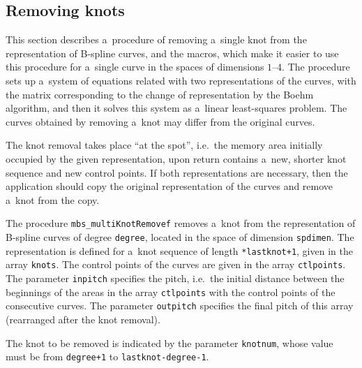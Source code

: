 \subsection{Removing knots}

This section describes a~procedure of removing a~single knot from the
representation of B-spline curves, and the macros, which make it easier to
use this procedure for a~single curve in the spaces of dimensions
$1$--$4$. The procedure sets up a~system of equations related with two
representations of the curves, with the matrix corresponding to the
change of representation by the Boehm algorithm, and then it solves this
system as a~linear least-squares problem. The curves obtained by
removing a~knot may differ from the original curves.

The knot removal takes place ``at the spot'', i.e.\ the memory area initially
occupied by the given representation, upon return contains a~new, shorter knot
sequence and new control points. If both representations are necessary,
then the application should copy the original representation of the curves
and remove a~knot from the copy.

\vspace{\bigskipamount}
\begin{sloppypar}
The procedure \texttt{mbs\_multiKnotRemovef} removes a~knot from the
representation of B-spline curves of degree \texttt{degree}, located in
the space of dimension \texttt{spdimen}.
The representation is defined for a~knot sequence of length
\texttt{*lastknot+1}, given in the array \texttt{knots}.
The control points of the curves are given in the array \texttt{ctlpoints}.
The parameter \texttt{inpitch} specifies the pitch, i.e.\ the initial distance
between the beginnings of the areas in the array \texttt{ctlpoints} with the
control points of the consecutive curves. The parameter \texttt{outpitch}
specifies the final pitch of this array (rearranged after the knot removal).
\end{sloppypar}

The knot to be removed is indicated by the parameter \texttt{knotnum},
whose value must be from \texttt{degree+1} to
\texttt{lastknot-degree-1}.

